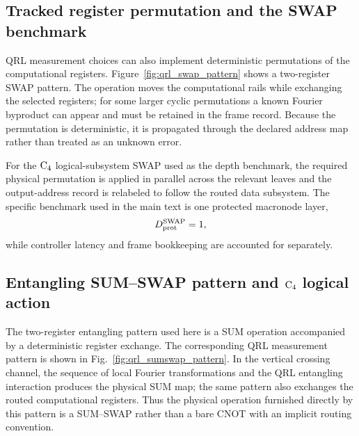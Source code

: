 \documentclass[aps,
prx,
superscriptaddress,
reprint,
longbibliography,
floatfix]{revtex4-2}
\begin{document}
\begin{minipage}{\columnwidth}
{
}
\caption{Representative QRL Fourier pattern. The highlighted effective map is $\hat F$ up to deterministic displacement and frame corrections. Parallel application to the ${\rm C_4}$ leaves supplies the physical $H^{\otimes4}$ component of the label-preserving logical Hadamard.}
\label{fig:qrl_fourier_pattern}
\end{minipage}
\par\medskip

\subsection{Tracked register permutation and the SWAP benchmark}
QRL measurement choices can also implement deterministic permutations of the computational registers. Figure~\ref{fig:qrl_swap_pattern} shows a two-register SWAP pattern. The operation moves the computational rails while exchanging the selected registers; for some larger cyclic permutations a known Fourier byproduct can appear and must be retained in the frame record. Because the permutation is deterministic, it is propagated through the declared address map rather than treated as an unknown error.

For the ${\rm C_4}$ logical-subsystem SWAP used as the depth benchmark, the required physical permutation is applied in parallel across the relevant leaves and the output-address record is relabeled to follow the routed data subsystem. The specific benchmark used in the main text is one protected macronode layer,
\begin{equation}
D_{\rm prot}^{\rm SWAP}=1,
\end{equation}
while controller latency and frame bookkeeping are accounted for separately.

\subsection{Entangling SUM--SWAP pattern and ${\rm C_4}$ logical action}
The two-register entangling pattern used here is a SUM operation accompanied by a deterministic register exchange. The corresponding QRL measurement pattern is shown in Fig.~\ref{fig:qrl_sumswap_pattern}. In the vertical crossing channel, the sequence of local Fourier transformations and the QRL entangling interaction produces the physical SUM map; the same pattern also exchanges the routed computational registers. Thus the physical operation furnished directly by this pattern is a SUM--SWAP rather than a bare CNOT with an implicit routing convention.
\end{document}
